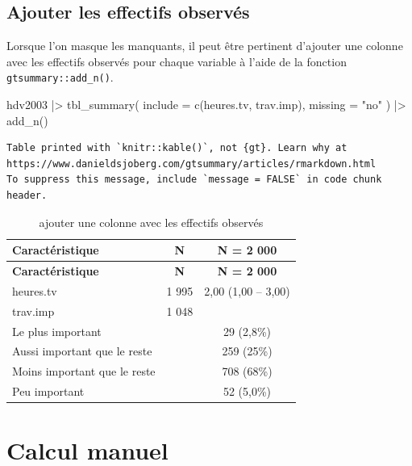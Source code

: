 \documentclass[
  letterpaper,
  DIV=11,
  numbers=noendperiod,
  oneside]{scrreprt}
\newenvironment{Shaded}{\begin{snugshade}}{\end{snugshade}}
\newcommand{\AttributeTok}[1]{\textcolor[rgb]{0.40,0.45,0.13}{#1}}
\newcommand{\FunctionTok}[1]{\textcolor[rgb]{0.28,0.35,0.67}{#1}}
\newcommand{\NormalTok}[1]{\textcolor[rgb]{0.00,0.23,0.31}{#1}}
\newcommand{\SpecialCharTok}[1]{\textcolor[rgb]{0.37,0.37,0.37}{#1}}
\newcommand{\StringTok}[1]{\textcolor[rgb]{0.13,0.47,0.30}{#1}}
\begin{document}
\hypertarget{ajouter-les-effectifs-observuxe9s}{%
\subsection{Ajouter les effectifs
observés}\label{ajouter-les-effectifs-observuxe9s}}

Lorsque l'on masque les manquants, il peut être pertinent d'ajouter une
colonne avec les effectifs observés pour chaque variable à l'aide de la
fonction \texttt{gtsummary::add\_n()}.

\begin{Shaded}
\begin{Highlighting}[]
\NormalTok{hdv2003 }\SpecialCharTok{|\textgreater{}}
  \FunctionTok{tbl\_summary}\NormalTok{(}
    \AttributeTok{include =} \FunctionTok{c}\NormalTok{(heures.tv, trav.imp),}
    \AttributeTok{missing =} \StringTok{"no"}
\NormalTok{  ) }\SpecialCharTok{|\textgreater{}} 
  \FunctionTok{add\_n}\NormalTok{()}
\end{Highlighting}
\end{Shaded}

\begin{verbatim}
Table printed with `knitr::kable()`, not {gt}. Learn why at
https://www.danieldsjoberg.com/gtsummary/articles/rmarkdown.html
To suppress this message, include `message = FALSE` in code chunk header.
\end{verbatim}

\hypertarget{tbl-add_n}{}
\begin{longtable}[]{@{}lcc@{}}
\caption{\label{tbl-add_n}ajouter une colonne avec les effectifs
observés}\tabularnewline
\toprule()
\textbf{Caractéristique} & \textbf{N} & \textbf{N = 2 000} \\
\midrule()
\endfirsthead
\toprule()
\textbf{Caractéristique} & \textbf{N} & \textbf{N = 2 000} \\
\midrule()
\endhead
heures.tv & 1 995 & 2,00 (1,00 -- 3,00) \\
trav.imp & 1 048 & \\
Le plus important & & 29 (2,8\%) \\
Aussi important que le reste & & 259 (25\%) \\
Moins important que le reste & & 708 (68\%) \\
Peu important & & 52 (5,0\%) \\
\bottomrule()
\end{longtable}

\hypertarget{calcul-manuel}{%
\section{Calcul manuel}\label{calcul-manuel}}
\end{document}
